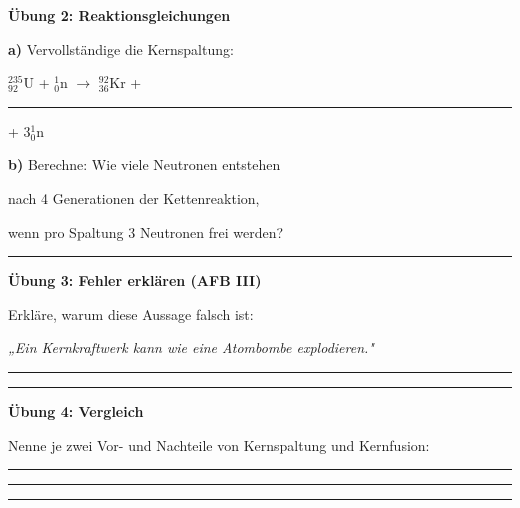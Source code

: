 \documentclass[10pt, a4paper]{article}
\newcommand{\fachfarbe}{physik}
\newcommand{\luecke}[1]{\rule{#1}{0.4pt}}
\newcommand{\abschnitt}[1]{%
    \vspace{8pt}\noindent\textbf{\textcolor{\fachfarbe}{#1}}\vspace{4pt}
}
\begin{document}
\begin{multicols}{2}
\vspace{8pt}


\abschnitt{Übung 2: Reaktionsgleichungen}

\textbf{a)} Vervollständige die Kernspaltung:

$^{235}_{92}$U + $^{1}_{0}$n $\rightarrow$ $^{92}_{36}$Kr + \luecke{1.5cm} + 3$^{1}_{0}$n

\vspace{6pt}

\textbf{b)} Berechne: Wie viele Neutronen entstehen

nach 4 Generationen der Kettenreaktion,

wenn pro Spaltung 3 Neutronen frei werden?

\vspace{4pt}
\luecke{5.8cm}

\vspace{8pt}


\abschnitt{Übung 3: Fehler erklären (AFB III)}

\begin{fehlerbox}
Erkläre, warum diese Aussage falsch ist:

\vspace{4pt}

\textit{„Ein Kernkraftwerk kann wie eine Atombombe explodieren."}

\vspace{4pt}
\luecke{5.8cm}

\vspace{4pt}
\luecke{5.8cm}
\end{fehlerbox}

\vspace{8pt}


\abschnitt{Übung 4: Vergleich}

Nenne je zwei Vor- und Nachteile von Kernspaltung und Kernfusion:

\vspace{4pt}
\luecke{5.8cm}

\vspace{4pt}
\luecke{5.8cm}

\vspace{4pt}
\luecke{5.8cm}

\end{multicols}
\end{document}
